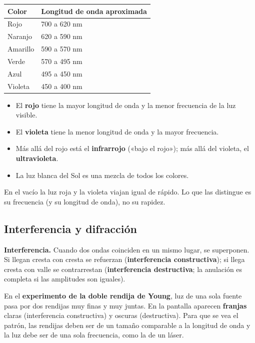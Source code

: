  
\begin{center}\small
\begin{tabular}{@{}ll@{}}
\toprule
\textbf{Color} & \textbf{Longitud de onda aproximada} \\
\midrule
Rojo & 700 a 620 nm \\
Naranjo & 620 a 590 nm \\
Amarillo & 590 a 570 nm \\
Verde & 570 a 495 nm \\
Azul & 495 a 450 nm \\
Violeta & 450 a 400 nm \\
\bottomrule
\end{tabular}
\end{center}
  
\begin{itemize}
  \item El \textbf{rojo} tiene la mayor longitud de onda y la menor frecuencia de la luz visible.
  \item El \textbf{violeta} tiene la menor longitud de onda y la mayor frecuencia.
  \item Más allá del rojo está el \textbf{infrarrojo} («bajo el rojo»); más allá del violeta, el \textbf{ultravioleta}.
  \item La luz blanca del Sol es una mezcla de todos los colores.
\end{itemize}
 
\begin{clave}[{Recuerda}] En el vacío la luz roja y la violeta viajan igual de rápido. Lo que las distingue es su frecuencia (y su longitud de onda), no su rapidez.\end{clave}
\subsection{Interferencia y difracción}
\textbf{Interferencia.} Cuando dos ondas coinciden en un mismo lugar, se superponen. Si llegan cresta con cresta se refuerzan (\textbf{interferencia constructiva}); si llega cresta con valle se contrarrestan (\textbf{interferencia destructiva}; la anulación es completa si las amplitudes son iguales).

 

En el \textbf{experimento de la doble rendija de Young}, luz de una sola fuente pasa por dos rendijas muy finas y muy juntas. En la pantalla aparecen \textbf{franjas} claras (interferencia constructiva) y oscuras (destructiva). Para que se vea el patrón, las rendijas deben ser de un tamaño comparable a la longitud de onda y la luz debe ser de una sola frecuencia, como la de un láser.

